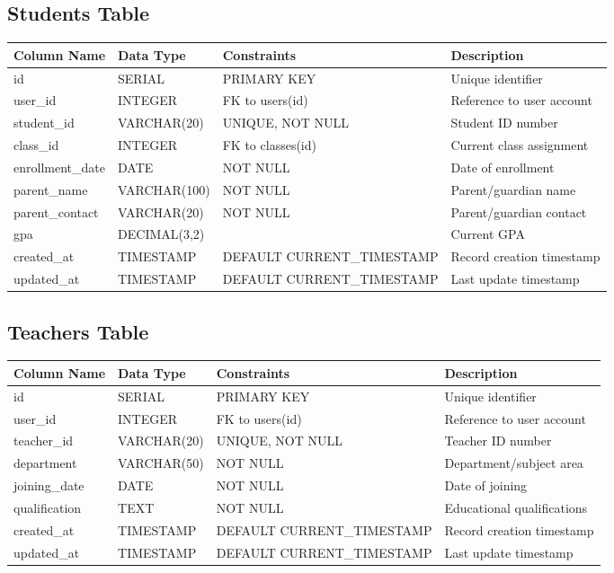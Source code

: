 \documentclass[11pt,a4paper]{article}
\begin{document}
\subsection{Students Table}
\begin{longtable}{|p{3cm}|p{3cm}|p{2cm}|p{6cm}|}
\hline
\textbf{Column Name} & \textbf{Data Type} & \textbf{Constraints} & \textbf{Description} \\
\hline
\endhead
id & SERIAL & PRIMARY KEY & Unique identifier \\
\hline
user\_id & INTEGER & FK to users(id) & Reference to user account \\
\hline
student\_id & VARCHAR(20) & UNIQUE, NOT NULL & Student ID number \\
\hline
class\_id & INTEGER & FK to classes(id) & Current class assignment \\
\hline
enrollment\_date & DATE & NOT NULL & Date of enrollment \\
\hline
parent\_name & VARCHAR(100) & NOT NULL & Parent/guardian name \\
\hline
parent\_contact & VARCHAR(20) & NOT NULL & Parent/guardian contact \\
\hline
gpa & DECIMAL(3,2) & & Current GPA \\
\hline
created\_at & TIMESTAMP & DEFAULT CURRENT\_TIMESTAMP & Record creation timestamp \\
\hline
updated\_at & TIMESTAMP & DEFAULT CURRENT\_TIMESTAMP & Last update timestamp \\
\hline
\end{longtable}

\subsection{Teachers Table}
\begin{longtable}{|p{3cm}|p{3cm}|p{2cm}|p{6cm}|}
\hline
\textbf{Column Name} & \textbf{Data Type} & \textbf{Constraints} & \textbf{Description} \\
\hline
\endhead
id & SERIAL & PRIMARY KEY & Unique identifier \\
\hline
user\_id & INTEGER & FK to users(id) & Reference to user account \\
\hline
teacher\_id & VARCHAR(20) & UNIQUE, NOT NULL & Teacher ID number \\
\hline
department & VARCHAR(50) & NOT NULL & Department/subject area \\
\hline
joining\_date & DATE & NOT NULL & Date of joining \\
\hline
qualification & TEXT & NOT NULL & Educational qualifications \\
\hline
created\_at & TIMESTAMP & DEFAULT CURRENT\_TIMESTAMP & Record creation timestamp \\
\hline
updated\_at & TIMESTAMP & DEFAULT CURRENT\_TIMESTAMP & Last update timestamp \\
\hline
\end{longtable}
\end{document}

